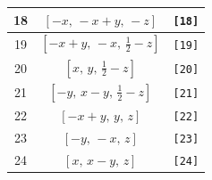 \documentclass[fleqn,8pt]{jsarticle}
\begin{document}
\begin{longtable}{ccc}
18 & $\left[ - x,\, - x + y,\, - z \right]$ & {\tt [18]} \\ \hline
19 & $\left[ - x + y,\, - x,\, \frac{1}{2} - z \right]$ & {\tt [19]} \\ \hline
20 & $\left[ x,\, y,\, \frac{1}{2} - z \right]$ & {\tt [20]} \\ \hline
21 & $\left[ - y,\, x - y,\, \frac{1}{2} - z \right]$ & {\tt [21]} \\ \hline
22 & $\left[ - x + y,\, y,\, z \right]$ & {\tt [22]} \\ \hline
23 & $\left[ - y,\, - x,\, z \right]$ & {\tt [23]} \\ \hline
24 & $\left[ x,\, x - y,\, z \right]$ & {\tt [24]} \\
\end{longtable}
\end{document}
